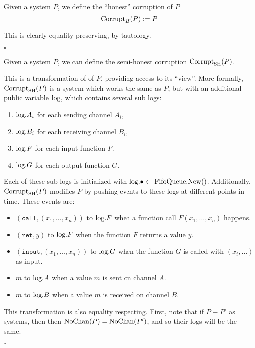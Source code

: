 \begin{definition}
Given a system $P$,
we define the ``honest'' corruption of $P$
$$
\text{Corrupt}_H(P) := P
$$

This is clearly equality preserving, by tautology.

$\square$
\end{definition}

\begin{definition}
Given a system $P$, we can define
the semi-honest corruption $\text{Corrupt}_{\text{SH}}(P)$.

This is a transformation of
of $P$, providing access to its ``view''.
More formally, $\text{Corrupt}_{\text{SH}}(P)$ is a system which works the same
as $P$, but with an additional public variable $\text{log}$,
which contains several sub logs:
\begin{enumerate}
  \item $\text{log}.{A_i}$ for each sending channel $A_i$,
  \item $\text{log}.{B_i}$ for each receiving channel $B_i$,
  \item $\text{log}.F$ for each input function $F$.
  \item $\text{log}.G$ for each output function $G$.
\end{enumerate}
Each of these sub logs is initialized with ${\text{log}.\bullet \gets \text{FifoQueue.New()}}$.
Additionally, $\text{Corrupt}_{\text{SH}}(P)$ modifies $P$ by pushing events to these
logs at different points in time.
These events are:
\begin{itemize}
\item $(\texttt{call}, (x_1, \ldots, x_n))$ to $\text{log}.F$ when a function call $F(x_1, \ldots, x_n)$ happens.
\item $(\texttt{ret}, y)$ to $\text{log}.F$ when the function $F$ returns a value $y$.
\item $(\texttt{input}, (x_1, \ldots, x_n))$ to $\text{log}.G$ when the function $G$ is called with $(x_i, \ldots)$ as input.
\item $m$ to $\text{log}.A$ when a value $m$ is sent on channel $A$.
\item $m$ to $\text{log}.B$ when a value $m$ is received on channel $B$.
\end{itemize}

This transformation is also equality respecting.
First, note that if $P \equiv P'$ as systems, then
then $\text{NoChan}(P) = \text{NoChan}(P')$, and so their logs will be the same.

$\square$
\end{definition}

